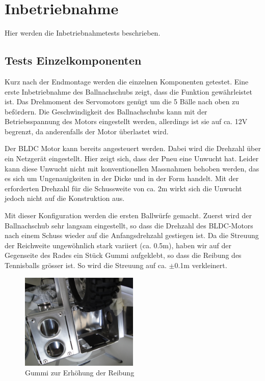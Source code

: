 \section{Inbetriebnahme}
Hier werden die Inbetriebnahmetests beschrieben.

\subsection{Tests Einzelkomponenten}
Kurz nach der Endmontage werden die einzelnen Komponenten getestet. Eine erste 
Inbetriebnahme des Ballnachschubs zeigt, dass die Funktion gewährleistet ist. 
Das Drehmoment des Servomotors genügt um die 5 Bälle nach oben zu befördern. 
Die Geschwindigkeit des Ballnachschubs kann mit der Betriebsspannung des 
Motors eingestellt werden, allerdings ist sie auf ca. 12V begrenzt, da 
anderenfalls der Motor überlastet wird.

\noindent
Der BLDC Motor kann bereits angesteuert werden. Dabei wird die Drehzahl über 
ein Netzgerät eingestellt. Hier zeigt sich, dass der Pneu eine Unwucht hat. Leider 
kann diese Unwucht nicht mit konventionellen Massnahmen behoben werden, das es 
sich um Ungenauigkeiten in der Dicke und in der Form handelt. Mit der 
erforderten Drehzahl für die Schussweite von ca. 2m wirkt sich die Unwucht 
jedoch nicht auf die Konstruktion aus.

\noindent
Mit dieser Konfiguration werden die ersten Ballwürfe gemacht. Zuerst wird der 
Ballnachschub sehr langsam eingestellt, so dass die Drehzahl des BLDC-Motors 
nach einem Schuss wieder auf die Anfangsdrehzahl gestiegen ist. Da die 
Streuung der Reichweite ungewöhnlich stark variiert (ca. 0.5m), haben wir auf 
der Gegenseite des Rades ein Stück Gummi aufgeklebt, so dass die Reibung des 
Tennisballs grösser ist. So wird die Streuung auf ca. $\pm$0.1m verkleinert. 

\begin{figure}[h!]          
	\centering             
	\includegraphics[width=0.5\textwidth]{fig/Bild_Gummi.JPG}
	\caption{Gummi zur Erhöhung der Reibung}
	\label{fig:Gummi}        
\end{figure}

